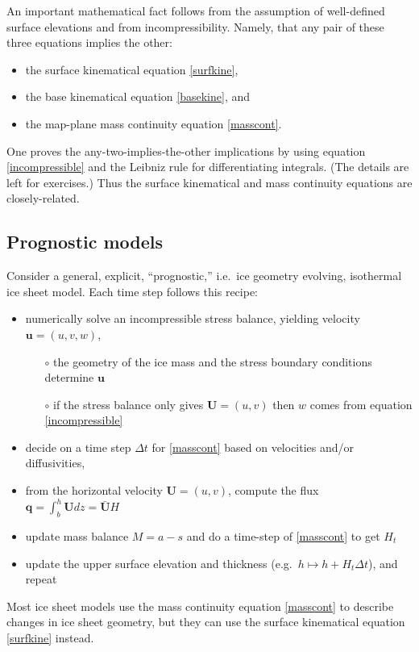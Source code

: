 \documentclass[letterpaper,final,12pt,reqno]{amsart}
\newcommand{\bq}{\mathbf{q}}
\newcommand{\bU}{\mathbf{U}}
\begin{document}
An important mathematical fact follows from the assumption of well-defined surface elevations and from incompressibility.  Namely, that any pair of these three equations implies the other:
  \begin{itemize}
  \item the surface kinematical equation \eqref{surfkine},
  \item the base kinematical equation \eqref{basekine}, and
  \item the map-plane mass continuity equation \eqref{masscont}.
  \end{itemize}
One proves the any-two-implies-the-other implications by using equation \eqref{incompressible} and the Leibniz rule for differentiating integrals.  (The details are left for exercises.)  Thus the surface kinematical and mass continuity equations are closely-related.

\subsection*{Prognostic models}  Consider a general, explicit, ``prognostic,'' i.e.~ice geometry evolving, isothermal ice sheet model.  Each time step follows this recipe:
  \begin{itemize}
  \item numerically solve an incompressible stress balance, yielding velocity $\mathbf{u}=(u,v,w)$,
    \begin{itemize}
    \item[$\circ$] the geometry of the ice mass and the stress boundary conditions determine $\mathbf{u}$
    \item[$\circ$] if the stress balance only gives $\mathbf{U}=(u,v)$ then $w$ comes from equation \eqref{incompressible}
    \end{itemize}
  \item decide on a time step $\Delta t$ for \eqref{masscont} based on velocities and/or diffusivities,
  \item from the horizontal velocity $\mathbf{U}=(u,v)$, compute the flux $\bq = \int_b^h \bU dz = \bar{\bU} H$
  \item update mass balance $M=a-s$ and do a time-step of \eqref{masscont} to get $H_t$
  \item update the upper surface elevation and thickness (e.g.~$h \mapsto h + H_t \Delta t$), and repeat
  \end{itemize}
Most ice sheet models use the mass continuity equation \eqref{masscont} to describe changes in ice sheet geometry, but they can use the surface kinematical equation \eqref{surfkine} instead.
\end{document}
